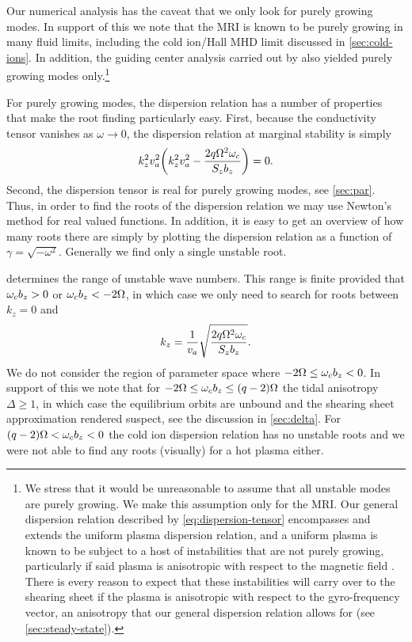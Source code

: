 \documentclass[aps,pre,notitlepage,amsmath,amssymb,amsfonts,nobibnotes,nofootinbib,superscriptaddress]{revtex4-1}
\begin{document}
Our numerical analysis has the caveat that we only look for purely growing
modes. In support of this we note that the MRI is known to be purely growing
in many fluid limits, including the cold ion/Hall MHD limit discussed in
\cref{sec:cold-ions}. In addition, the guiding center analysis carried out by
\citet{Quataert2002} also yielded purely growing modes only.\footnote{We
  stress that it would be unreasonable to assume that all unstable modes are
  purely growing. We make this assumption only for the MRI\@. Our general
  dispersion relation described by \cref{eq:dispersion-tensor} encompasses and
  extends the uniform plasma dispersion relation, and a uniform plasma is
  known to be subject to a host of instabilities that are not purely growing,
  particularly if said plasma is anisotropic with respect to the magnetic
  field \citep[see][and references therein]{Schekochihin2005,Sharma2006}.
  There is every reason to expect that these instabilities will carry over to
  the shearing sheet if the plasma is anisotropic with respect to the
  gyro-frequency vector, an anisotropy that our general dispersion relation
  allows for (see \cref{sec:steady-state}).}

For purely growing modes, the dispersion relation has a number of properties
that make the root finding particularly easy. First, because the conductivity
tensor vanishes as $\omega\to0$, the dispersion relation at marginal stability
is simply
\begin{equation}
  \label{eq:marginal-stability}
  k_z^2\va^2\left(k_z^2\va^2 - \frac{2q\Omega^2\omc}{S_z b_z}\right) = 0.
\end{equation}
Second, the dispersion tensor is real for purely growing modes, see
\cref{sec:par}. Thus, in order to find the roots of the dispersion relation we
may use Newton's method for real valued functions. In addition, it is easy to
get an overview of how many roots there are simply by plotting the dispersion
relation as a function of $\gamma=\sqrt{-\omega^2}$. Generally we find only a
single unstable root.

 determines the range of unstable wave numbers.
This range is finite provided that $\omega_c{}b_z>0$ or $\omega_c{}b_z<-2\Omega$, in
which case we only need to search for roots between $k_z=0$ and
\begin{equation}
  k_z = \frac{1}{v_a}\sqrt{\frac{2q\Omega^2\omega_c}{S_z b_z}}.
\end{equation}
We do not consider the region of parameter space where
$-2\Omega\le\omega_c{}b_z<0$. In support of this we note that for
$-2\Omega\le\omega_c{}b_z\le(q-2)\Omega$ the tidal anisotropy $\Delta\ge1$, in
which case the equilibrium orbits are unbound and the shearing sheet
approximation rendered suspect, see the discussion in \cref{sec:delta}. For
$(q-2)\Omega<\omega_c{}b_z<0$ the cold ion dispersion relation has no unstable
roots \citep{Wardle1999} and we were not able to find any roots (visually) for
a hot plasma either.
\end{document}
